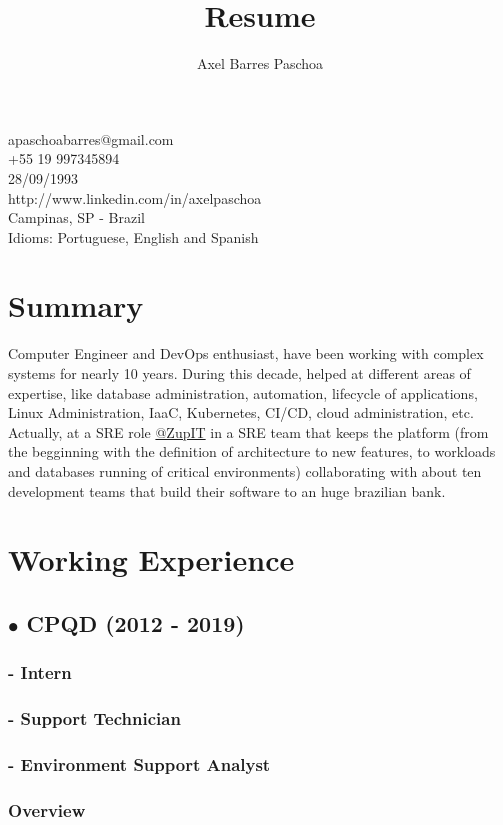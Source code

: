 \documentclass{article}
\makeatletter
\renewcommand{\maketitle}{

\begin{center}

{\huge\bfseries\theauthor}

apaschoabarres@gmail.com \\
+55 19 997345894 \\
28/09/1993 \\
http://www.linkedin.com/in/axelpaschoa \\
Campinas, SP - Brazil \\
Idioms: Portuguese, English and Spanish
\end{center}
}
\makeatother
\begin{document}
\title{Resume}
\author{Axel Barres Paschoa}

\maketitle

\section{Summary}

Computer Engineer and DevOps enthusiast, have been working with complex systems for nearly 10 years. During this decade, helped at different areas of expertise, like database administration, automation, lifecycle of applications, Linux Administration, IaaC, Kubernetes, CI/CD, cloud administration, etc. Actually, at a SRE role \href{https://github.com/ZupIT}{@ZupIT} in a SRE team that keeps the platform (from the begginning with the definition of architecture to new features, to workloads and databases running of critical environments) collaborating with about ten development teams that build their software to an huge brazilian bank.


\section{Working Experience}

\subsection{$\bullet$ CPQD (2012 - 2019)}

\subsubsection{- Intern}

\subsubsection{- Support Technician}

\subsubsection{- Environment Support Analyst \\}

\subsubsection{Overview \\}
\end{document}
